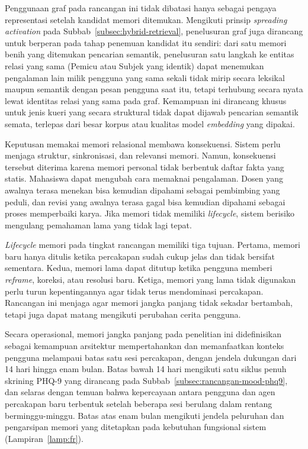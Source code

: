 Penggunaan graf pada rancangan ini tidak dibatasi hanya sebagai pengaya representasi setelah kandidat memori ditemukan. Mengikuti prinsip \textit{spreading activation} \parencite{collinsloftus1975} pada Subbab~\ref{subsec:hybrid-retrieval}, penelusuran graf juga dirancang untuk berperan pada tahap penemuan kandidat itu sendiri: dari satu memori benih yang ditemukan pencarian semantik, penelusuran satu langkah ke entitas relasi yang sama (Pemicu atau Subjek yang identik) dapat menemukan pengalaman lain milik pengguna yang sama sekali tidak mirip secara leksikal maupun semantik dengan pesan pengguna saat itu, tetapi terhubung secara nyata lewat identitas relasi yang sama pada graf. Kemampuan ini dirancang khusus untuk jenis kueri yang secara struktural tidak dapat dijawab pencarian semantik semata, terlepas dari besar korpus atau kualitas model \textit{embedding} yang dipakai.

Keputusan memakai memori relasional membawa konsekuensi. Sistem perlu menjaga struktur, sinkronisasi, dan relevansi memori. Namun, konsekuensi tersebut diterima karena memori personal tidak berbentuk daftar fakta yang statis. Mahasiswa dapat mengubah cara memaknai pengalaman. Dosen yang awalnya terasa menekan bisa kemudian dipahami sebagai pembimbing yang peduli, dan revisi yang awalnya terasa gagal bisa kemudian dipahami sebagai proses memperbaiki karya. Jika memori tidak memiliki \textit{lifecycle}, sistem berisiko mengulang pemahaman lama yang tidak lagi tepat.

\textit{Lifecycle} memori pada tingkat rancangan memiliki tiga tujuan. Pertama, memori baru hanya ditulis ketika percakapan sudah cukup jelas dan tidak bersifat sementara. Kedua, memori lama dapat ditutup ketika pengguna memberi \textit{reframe}, koreksi, atau resolusi baru. Ketiga, memori yang lama tidak digunakan perlu turun kepentingannya agar tidak terus mendominasi percakapan. Rancangan ini menjaga agar memori jangka panjang tidak sekadar bertambah, tetapi juga dapat matang mengikuti perubahan cerita pengguna.

Secara operasional, memori jangka panjang pada penelitian ini didefinisikan sebagai kemampuan arsitektur mempertahankan dan memanfaatkan konteks pengguna melampaui batas satu sesi percakapan, dengan jendela dukungan dari 14 hari hingga enam bulan. Batas bawah 14 hari mengikuti satu siklus penuh skrining PHQ-9 yang dirancang pada Subbab~\ref{subsec:rancangan-mood-phq9}, dan selaras dengan temuan \textcite{bickmorePicard2005} bahwa kepercayaan antara pengguna dan agen percakapan baru terbentuk setelah beberapa sesi berulang dalam rentang berminggu-minggu. Batas atas enam bulan mengikuti jendela peluruhan dan pengarsipan memori yang ditetapkan pada kebutuhan fungsional sistem (Lampiran~\ref{lamp:fr}).

